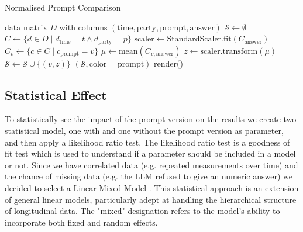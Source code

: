 \begin{algorithm}[htb]
    \caption{Normalised Prompt Comparison} 
    \label{alg:normalised_prompt}
    \begin{algorithmic}[1]
        \Require data matrix $D$ with columns $(\text{time}, \text{party}, \text{prompt}, \text{answer})$
        \State $\mathcal{S} \gets \emptyset$ 
                \State $C \gets \{d \in D \mid d_{\text{time}} = t \wedge d_{\text{party}} = p\}$ 
                \State $\text{scaler} \gets \text{StandardScaler.fit}(C_{\text{answer}})$ 
                 
                    \State $C_v \gets \{c \in C \mid c_{\text{prompt}} = v\}$ 
                    \State $\mu \gets \text{mean}(C_{v,\text{answer}})$ 
                    \State $z \gets \text{scaler.transform}(\mu)$ 
                    \State $\mathcal{S} \gets \mathcal{S} \cup \{(v, z)\}$ 
                \EndFor
            \EndFor
        \EndFor
        \State {}$(\mathcal{S}, \text{color}=\text{prompt})$ 
        \State render()
    \end{algorithmic}
\end{algorithm}


\subsection{Statistical Effect}

To statistically see the impact of the prompt version on the results we create two statistical model, one with and one without the prompt version as parameter, and then apply a likelihood ratio test. The likelihood ratio  test is a goodness of fit test which is used to understand if a parameter should be included in a model or not.  Since we have correlated data (e.g. repeated measurements over time) and the chance of missing data (e.g. the LLM refused to give an numeric answer) we decided to select a Linear Mixed Model \citep{Nan1982Random}. This statistical approach is an extension of general linear models, particularly adept at handling the hierarchical structure of longitudinal data. The "mixed" designation refers to the model's ability to incorporate both fixed and random effects.

